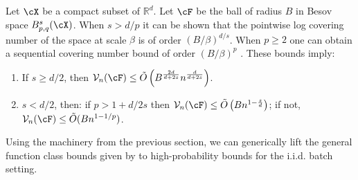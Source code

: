 \begin{example}
Let $\X$ be a compact subset of $\mathbb{R}^d$. Let $\F$ be the ball of radius $B$ in Besov space $B^s_{p,q}(\X)$. When $s > d/p$ it can be shown that the pointwise log covering number of the space at scale $\beta$ is of order $(B/\beta)^{d/s}$. When $p \ge 2$ one can obtain a sequential covering number bound of order $(B/\beta)^p$ \citep[Section 5.8]{RakSri15a}. These bounds imply:
\begin{enumerate}
 \item If $s \ge d/2$, then $\mathcal{V}_n(\F) \le \tilde{O}\left(B^{\frac{2d}{d + 2s}} n^{\frac{d}{d + 2s}} \right)$.
 \item $s < d/2$, then: if $p > 1 + d/2s$ then $\mathcal{V}_n(\F) \le \tilde{O}\left(B n^{1 - \frac{s}{d}} \right)$; if not, $\mathcal{V}_n(\F)  \le \tilde{O}(B n^{1 - 1/p})$.
\end{enumerate}
\end{example}
\begin{remark}
Using the machinery from the previous section, we can generically lift the general function class bounds given by  to high-probability bounds for the i.i.d. batch setting.
\end{remark}

